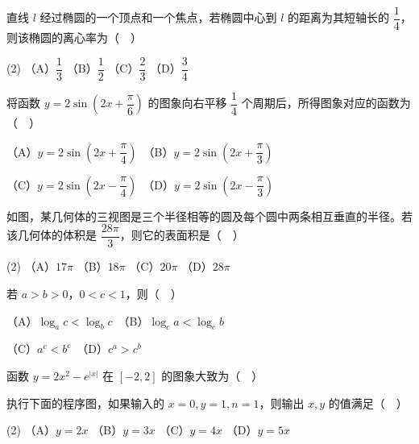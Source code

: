 \begin{question}
直线 \(l\) 经过椭圆的一个顶点和一个焦点，若椭圆中心到 \(l\) 的距离为其短轴长的 \(\dfrac{1}{4}\)，则该椭圆的离心率为（　）

\begin{gkopts}(2)
\task （A）\(\dfrac{1}{3}\)
\task （B）\(\dfrac{1}{2}\)
\task （C）\(\dfrac{2}{3}\)
\task （D）\(\dfrac{3}{4}\)
\end{gkopts}

\end{question}
\begin{question}
将函数 \(y=2\sin\left(2x+\dfrac{\pi}{6}\right)\) 的图象向右平移 \(\dfrac{1}{4}\) 个周期后，所得图象对应的函数为（　）

   （A）\(y=2\sin\left(2x+\dfrac{\pi}{4}\right)\)　（B）\(y=2\sin\left(2x+\dfrac{\pi}{3}\right)\)

   （C）\(y=2\sin\left(2x-\dfrac{\pi}{4}\right)\)　（D）\(y=2\sin\left(2x-\dfrac{\pi}{3}\right)\)

\Needspace{0.4\textheight}
\end{question}
\begin{question}
如图，某几何体的三视图是三个半径相等的圆及每个圆中两条相互垂直的半径。若该几何体的体积是 \(\dfrac{28\pi}{3}\)，则它的表面积是（　）
\nopagebreak[4]
\begin{center}\end{center}
\nopagebreak[4]
\begin{gkopts}(2)
\task （A）\(17\pi\)
\task （B）\(18\pi\)
\task （C）\(20\pi\)
\task （D）\(28\pi\)
\end{gkopts}

\end{question}
\begin{question}
若 \(a>b>0\)，\(0<c<1\)，则（　）

   （A）\(\log_a c<\log_b c\)　（B）\(\log_c a<\log_c b\)

   （C）\(a^c<b^c\)　（D）\(c^a>c^b\)

\Needspace{0.4\textheight}
\end{question}
\begin{question}
函数 \(y=2x^2-e^{|x|}\) 在 \([-2,2]\) 的图象大致为（　）
\nopagebreak[4]
\begin{center}\end{center}
\nopagebreak[4]
\Needspace{0.4\textheight}
\end{question}
\begin{question}
执行下面的程序图，如果输入的 \(x=0,y=1,n=1\)，则输出 \(x,y\) 的值满足（　）
\nopagebreak[4]
\begin{center}\end{center}
\nopagebreak[4]
\begin{gkopts}(2)
\task （A）\(y=2x\)
\task （B）\(y=3x\)
\task （C）\(y=4x\)
\task （D）\(y=5x\)
\end{gkopts}

\end{question}
